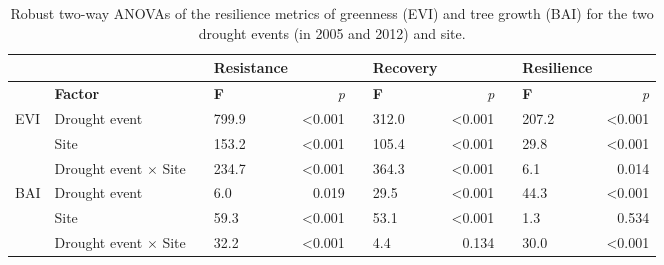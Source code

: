 \begin{table}[h]
\caption{Robust two-way ANOVAs of the resilience metrics of greenness (EVI) and tree growth (BAI) for the two drought events (in 2005 and 2012) and site.}
\label{tab:dendro:robustanova}
\begingroup\fontsize{8}{10}\selectfont
\begin{tabular}{@{}llllrllrllr@{}}
\toprule
 &  &  & \textbf{Resistance} &  &  & \textbf{Recovery} &  &  & \textbf{Resilience} &  \\ \midrule
 & \textbf{Factor} &  & \textbf{F} & \textit{p} &  & \textbf{F} & \textit{p} &  & \textbf{F} & \textit{p} \\ \cmidrule(lr){4-5} \cmidrule(lr){7-8} \cmidrule(l){10-11} 
\multirow{3}{*}{EVI} & Drought event &  & 799.9 & \textless 0.001 &  & 312.0 & \textless 0.001 &  & 207.2 & \textless 0.001 \\
 & Site &  & 153.2 & \textless 0.001 &  & 105.4 & \textless 0.001 &  & 29.8 & \textless 0.001 \\
 & Drought event $\times$ Site &  & 234.7 & \textless 0.001 &  & 364.3 & \textless 0.001 &  & 6.1 & 0.014 \\ \midrule
\multirow{3}{*}{BAI} & Drought event &  & 6.0 & 0.019 &  & 29.5 & \textless 0.001 &  & 44.3 & \textless 0.001 \\
 & Site &  & 59.3 & \textless 0.001 &  & 53.1 & \textless 0.001 &  & 1.3 & 0.534 \\
 & Drought event $\times$ Site &  & 32.2 & \textless 0.001 &  & 4.4 & 0.134 &  & 30.0 & \textless 0.001 \\ \bottomrule
\end{tabular}
\endgroup{}
\end{table}

